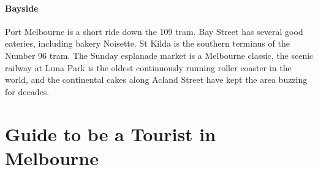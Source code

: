  

\paragraph{Bayside}

Port Melbourne is a short ride down the 109 tram. Bay Street has several good
eateries, including bakery Noisette.
St Kilda is the southern terminus of the Number 96 tram. The Sunday 
esplanade
market is a Melbourne classic, the scenic railway at Luna Park is the 
oldest
continuously running roller coaster in the world, and the continental 
cakes
along Acland Street have kept the area buzzing for decades.






\section*{Guide to be a Tourist in Melbourne}
\vspace*{-1em}

